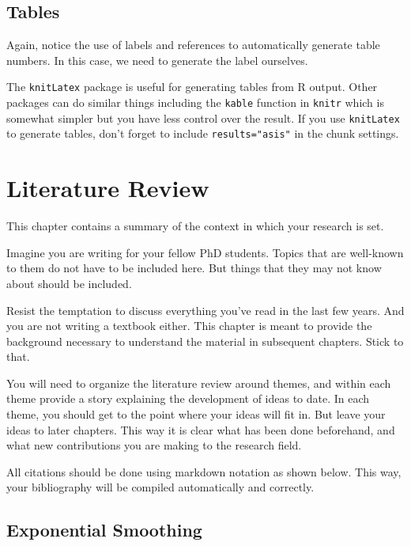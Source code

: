\documentclass{sydneythesis}
\begin{document}
\hypertarget{tables}{%
\section{Tables}\label{tables}}

Again, notice the use of labels and references to automatically generate table numbers. In this case, we need to generate the label ourselves.

The \texttt{knitLatex} package is useful for generating tables from R output. Other packages can do similar things including the \texttt{kable} function in \texttt{knitr} which is somewhat simpler but you have less control over the result. If you use \texttt{knitLatex} to generate tables, don't forget to include \texttt{results="asis"} in the chunk settings.

\hypertarget{ch:litreview}{%
\chapter{Literature Review}\label{ch:litreview}}

This chapter contains a summary of the context in which your research is set.

Imagine you are writing for your fellow PhD students. Topics that are well-known to them do not have to be included here. But things that they may not know about should be included.

Resist the temptation to discuss everything you've read in the last few years. And you are not writing a textbook either. This chapter is meant to provide the background necessary to understand the material in subsequent chapters. Stick to that.

You will need to organize the literature review around themes, and within each theme provide a story explaining the development of ideas to date. In each theme, you should get to the point where your ideas will fit in. But leave your ideas to later chapters. This way it is clear what has been done beforehand, and what new contributions you are making to the research field.

All citations should be done using markdown notation as shown below. This way, your bibliography will be compiled automatically and correctly.

\hypertarget{sec:expsmooth}{%
\section{Exponential Smoothing}\label{sec:expsmooth}}
\end{document}
